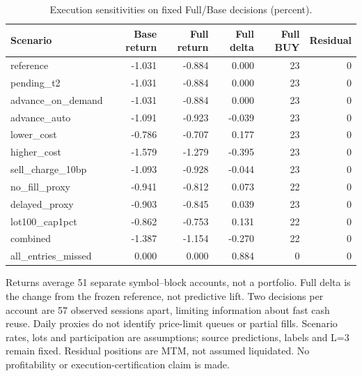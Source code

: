\begin{table}[htbp]
\centering\small
\caption{Execution sensitivities on fixed Full/Base decisions (percent).}
\label{tab:d207_execution}
\setlength{\tabcolsep}{3.5pt}
\begin{tabular}{lrrrrr}
\hline
Scenario & Base return & Full return & Full delta & Full BUY & Residual \\
\hline
reference & -1.031 & -0.884 & 0.000 & 23 & 0 \\
pending\_t2 & -1.031 & -0.884 & 0.000 & 23 & 0 \\
advance\_on\_demand & -1.031 & -0.884 & 0.000 & 23 & 0 \\
advance\_auto & -1.091 & -0.923 & -0.039 & 23 & 0 \\
lower\_cost & -0.786 & -0.707 & 0.177 & 23 & 0 \\
higher\_cost & -1.579 & -1.279 & -0.395 & 23 & 0 \\
sell\_charge\_10bp & -1.093 & -0.928 & -0.044 & 23 & 0 \\
no\_fill\_proxy & -0.941 & -0.812 & 0.073 & 22 & 0 \\
delayed\_proxy & -0.903 & -0.845 & 0.039 & 23 & 0 \\
lot100\_cap1pct & -0.862 & -0.753 & 0.131 & 22 & 0 \\
combined & -1.387 & -1.154 & -0.270 & 22 & 0 \\
all\_entries\_missed & 0.000 & 0.000 & 0.884 & 0 & 0 \\
\hline
\end{tabular}
\par\smallskip\footnotesize Returns average 51 separate symbol--block accounts, not a portfolio. Full delta is the change from the frozen reference, not predictive lift. Two decisions per account are 57 observed sessions apart, limiting information about fast cash reuse. Daily proxies do not identify price-limit queues or partial fills. Scenario rates, lots and participation are assumptions; source predictions, labels and L=3 remain fixed. Residual positions are MTM, not assumed liquidated. No profitability or execution-certification claim is made.
\end{table}
